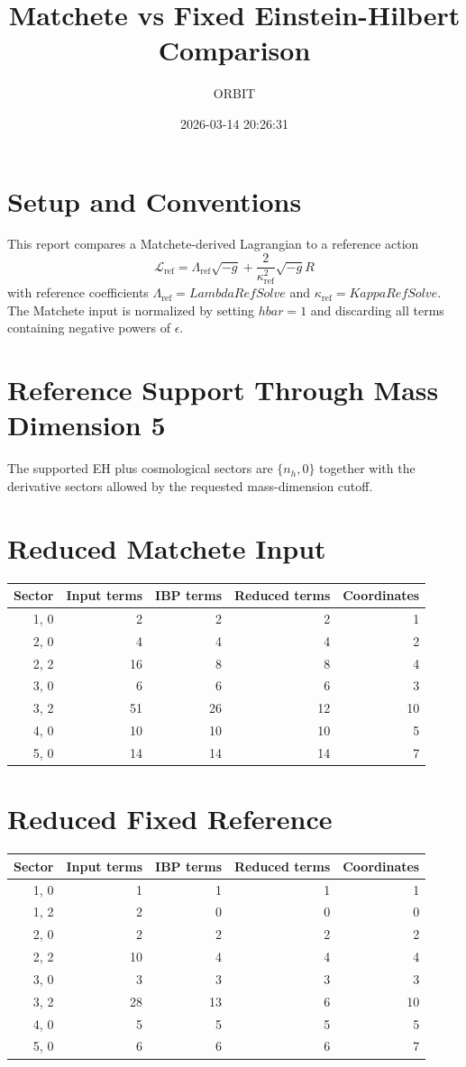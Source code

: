 \documentclass[11pt]{article}
\title{Matchete vs Fixed Einstein-Hilbert Comparison}
\author{ORBIT}
\date{2026-03-14 20:26:31}
\begin{document}
\maketitle
\tableofcontents
\section{Setup and Conventions}
This report compares a Matchete-derived Lagrangian to a reference action
\begin{equation}
\mathcal{L}_{\mathrm{ref}} = \Lambda_{\mathrm{ref}} \sqrt{-g} + \frac{2}{\kappa_{\mathrm{ref}}^2} \sqrt{-g} R
\end{equation}
with reference coefficients $\Lambda_{\mathrm{ref}} = LambdaRefSolve$ and $\kappa_{\mathrm{ref}} = KappaRefSolve$.
The Matchete input is normalized by setting $hbar = 1$ and discarding all terms containing negative powers of $\epsilon$.
\section{Reference Support Through Mass Dimension 5}
The supported EH plus cosmological sectors are $\{n_h, 0\}$ together with the derivative sectors allowed by the requested mass-dimension cutoff.
\section{Reduced Matchete Input}
\begin{longtable}{rrrrr}
\toprule
Sector & Input terms & IBP terms & Reduced terms & Coordinates \\
\midrule
{1, 0} & 2 & 2 & 2 & 1 \\
{2, 0} & 4 & 4 & 4 & 2 \\
{2, 2} & 16 & 8 & 8 & 4 \\
{3, 0} & 6 & 6 & 6 & 3 \\
{3, 2} & 51 & 26 & 12 & 10 \\
{4, 0} & 10 & 10 & 10 & 5 \\
{5, 0} & 14 & 14 & 14 & 7 \\
\bottomrule
\end{longtable}
\section{Reduced Fixed Reference}
\begin{longtable}{rrrrr}
\toprule
Sector & Input terms & IBP terms & Reduced terms & Coordinates \\
\midrule
{1, 0} & 1 & 1 & 1 & 1 \\
{1, 2} & 2 & 0 & 0 & 0 \\
{2, 0} & 2 & 2 & 2 & 2 \\
{2, 2} & 10 & 4 & 4 & 4 \\
{3, 0} & 3 & 3 & 3 & 3 \\
{3, 2} & 28 & 13 & 6 & 10 \\
{4, 0} & 5 & 5 & 5 & 5 \\
{5, 0} & 6 & 6 & 6 & 7 \\
\bottomrule
\end{longtable}
\end{document}
